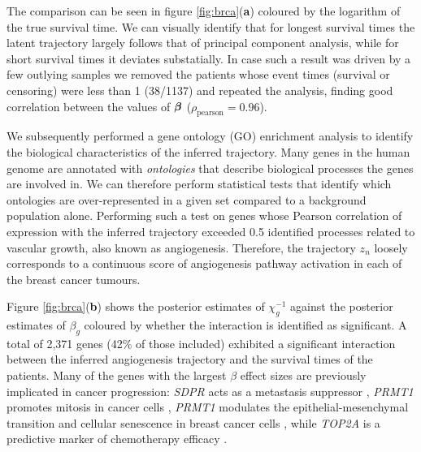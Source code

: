 The comparison can be seen in figure \ref{fig:brca}(\textbf{a}) coloured by the logarithm of the true survival time. We can visually identify that for longest survival times the latent trajectory largely follows that of principal component analysis, while for short survival times it deviates substatially. In case such a result was driven by a few outlying samples we removed the patients whose event times (survival or censoring) were less than 1 (38/1137) and repeated the analysis, finding good correlation between the values of $\bm{\beta}$ ($\rho_{\text{pearson}} = 0.96$).

We subsequently performed a gene ontology (GO) enrichment analysis to identify the biological characteristics of the inferred trajectory. Many genes in the human genome are annotated with \emph{ontologies} that describe biological processes the genes are involved in. We can therefore perform statistical tests \citep{young2010gene} that identify which ontologies are over-represented in a given set compared to a background population alone. Performing such a test on genes whose Pearson correlation of expression with the inferred trajectory exceeded 0.5 identified processes related to vascular growth, also known as angiogenesis. Therefore, the trajectory $z_n$ loosely corresponds to a continuous score of angiogenesis pathway activation in each of the breast cancer tumours.


Figure \ref{fig:brca}(\textbf{b}) shows the posterior estimates of $\chi_g^{-1}$ against the posterior estimates of $\beta_g$ coloured by whether the interaction is identified as significant. %
A total of 2,371 genes (42\% of those included) exhibited a significant interaction between the inferred angiogenesis trajectory and the survival times of the patients. Many of the genes with the largest $\beta$ effect sizes are previously implicated in cancer progression: \emph{SDPR} acts as a metastasis suppressor \citep{ozturk2016sdpr}, \emph{PRMT1} promotes mitosis in
cancer cells \citep{deng2015prmt1}, \emph{PRMT1} modulates the epithelial-mesenchymal transition and cellular senescence in breast cancer cells \citep{gao2016dual}, while \emph{TOP2A} is a predictive marker of chemotherapy efficacy \citep{wang2012top2a}.


